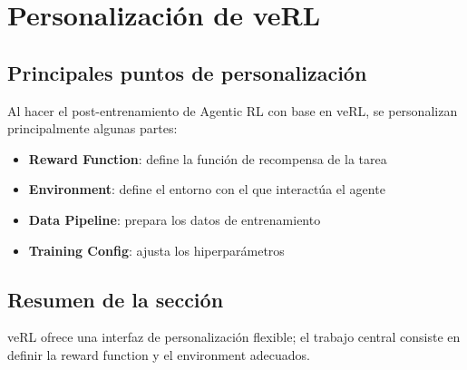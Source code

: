\section{Personalización de veRL}
\subsection{Principales puntos de personalización}
Al hacer el post-entrenamiento de Agentic RL con base en veRL, se personalizan principalmente algunas partes:
\begin{itemize}
  \item \textbf{Reward Function}: define la función de recompensa de la tarea
  \item \textbf{Environment}: define el entorno con el que interactúa el agente
  \item \textbf{Data Pipeline}: prepara los datos de entrenamiento
  \item \textbf{Training Config}: ajusta los hiperparámetros
\end{itemize}

\subsection{Resumen de la sección}
veRL ofrece una interfaz de personalización flexible; el trabajo central consiste en definir la reward function y el environment adecuados.

